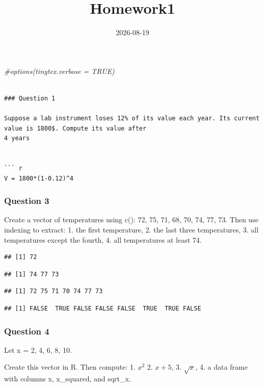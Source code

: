 \documentclass[
]{article}
\title{Homework1}
\author{}
\date{\vspace{-2.5em}2026-08-19}
\newenvironment{Shaded}{\begin{snugshade}}{\end{snugshade}}
\newcommand{\CommentTok}[1]{\textcolor[rgb]{0.56,0.35,0.01}{\textit{#1}}}
\begin{document}
\maketitle

\begin{Shaded}
\begin{Highlighting}[]
\CommentTok{\#options(tinytex.verbose = TRUE)}
\end{Highlighting}
\end{Shaded}

\begin{verbatim}

### Question 1

Suppose a lab instrument loses 12% of its value each year. Its current value is 1800$. Compute its value after
4 years


``` r
V = 1800*(1-0.12)^4
\end{verbatim}

\subsubsection{Question 3}\label{question-3}

Create a vector of temperatures using c(): 72, 75, 71, 68, 70, 74, 77,
73. Then use indexing to extract: 1. the first temperature, 2. the last
three temperatures, 3. all temperatures except the fourth, 4. all
temperatures at least 74.

\begin{verbatim}
## [1] 72
\end{verbatim}

\begin{verbatim}
## [1] 74 77 73
\end{verbatim}

\begin{verbatim}
## [1] 72 75 71 70 74 77 73
\end{verbatim}

\begin{verbatim}
## [1] FALSE  TRUE FALSE FALSE FALSE  TRUE  TRUE FALSE
\end{verbatim}

\subsubsection{Question 4}\label{question-4}

Let x = 2, 4, 6, 8, 10.

Create this vector in R. Then compute: 1. \(x^2\) 2. \(x + 5\), 3.
\(\sqrt{x}\), 4. a data frame with columns x, x\_squared, and sqrt\_x.
\end{document}
